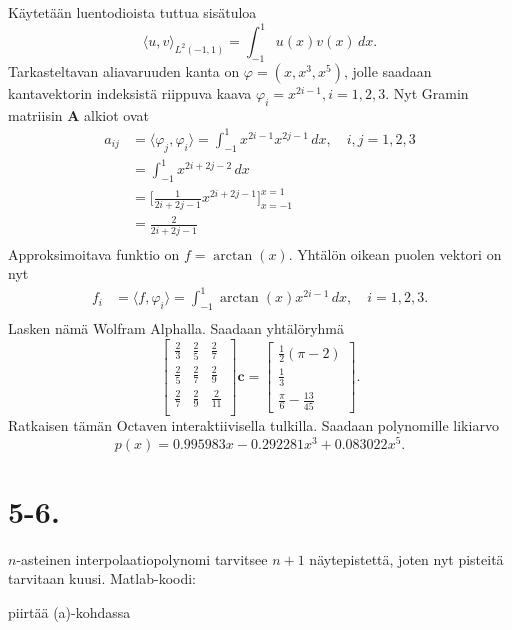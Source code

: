 \documentclass{article}
\begin{document}
Käytetään luentodioista tuttua sisätuloa
\[
  \langle u, v \rangle_{L^2(-1,1)} = \int_{-1}^{1} u(x)v(x)\,dx.
\]
Tarkasteltavan aliavaruuden kanta on $\varphi = (x, x^3, x^5)$,
jolle saadaan kantavektorin indeksistä riippuva kaava
$\varphi_i = x^{2i-1}, i = 1,2,3$.
Nyt Gramin matriisin $\mathbf{A}$ alkiot ovat
\begin{align*}
  a_{ij} &= \langle \varphi_j, \varphi_i \rangle
        = \int_{-1}^{1} x^{2i-1}x^{2j-1}\,dx, \quad i,j=1,2,3 \\
         &= \int_{-1}^{1} x^{2i+2j-2}\,dx \\
         &= \Big[\frac{1}{2i+2j-1}x^{2i+2j-1}\Big]_{x=-1}^{x=1} \\
         &= \frac{2}{2i+2j-1} \\
\end{align*}
Approksimoitava funktio on $f = \arctan(x)$.
Yhtälön oikean puolen vektori on nyt
\begin{align*}
  f_i &= \langle f, \varphi_i \rangle
  = \int_{-1}^{1} \arctan(x)x^{2i-1}\,dx, \quad i=1,2,3. \\
\end{align*}
Lasken nämä Wolfram Alphalla.
Saadaan yhtälöryhmä
\[
  \begin{bmatrix}
    \frac{2}{3} & \frac{2}{5} & \frac{2}{7} \\[0.5em]
    \frac{2}{5} & \frac{2}{7} & \frac{2}{9} \\[0.5em]
    \frac{2}{7} & \frac{2}{9} & \frac{2}{11} \\
  \end{bmatrix}
  \mathbf{c}
  =
  \begin{bmatrix}
    \frac{1}{2}(\pi - 2) \\ \frac{1}{3} \\ \frac{\pi}{6} - \frac{13}{45}
  \end{bmatrix}.
\]
Ratkaisen tämän Octaven interaktiivisella tulkilla.
Saadaan polynomille likiarvo
\[
  p(x) = 0.995983x - 0.292281x^3 + 0.083022x^5.
\]


\section*{5-6.}

$n$-asteinen interpolaatiopolynomi tarvitsee $n+1$ näytepistettä,
joten nyt pisteitä tarvitaan kuusi. Matlab-koodi:



piirtää (a)-kohdassa
\end{document}
